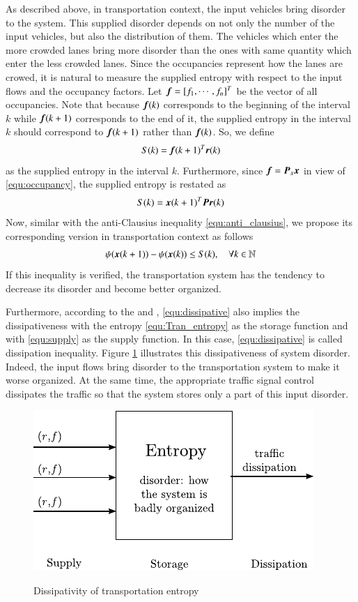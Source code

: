 \documentclass[preprint,authoryear,12pt]{elsarticle}
\renewcommand{\vec}[1]{\mbox{\boldmath$#1$}}
\newcommand{\mat}[1]{\mbox{\boldmath$#1$}}
\begin{document}
As described above, in transportation context, the input vehicles
bring disorder to the system. This supplied disorder depends on not
only the number of the input vehicles, but also the distribution of
them. The vehicles which enter the more crowded lanes bring more
disorder than the ones with same quantity which enter the less
crowded lanes. Since the occupancies represent how the lanes are
crowed, it is natural to measure the supplied entropy with respect to
the input flows and the occupancy factors. Let
$\vec{f}=[f_1,\cdots,f_n]^T$ be the vector of all occupancies. Note
that because $\vec{f}(k)$ corresponds to the beginning of the
interval $k$ while $\vec{f}(k+1)$ corresponds to the end of it, the
supplied entropy in the interval $k$ should correspond to
$\vec{f}(k+1)$ rather than $\vec{f}(k)$. So, we define
$$S(k)=\vec{f}(k+1)^T\vec{r}(k)$$
as the supplied entropy in the interval $k$. Furthermore, since
$\vec{f}=\mat{P}_x\vec{x}$ in view of \eqref{equ:occupancy}, the
supplied entropy is restated as
\begin{equation}\label{equ:supply}
    S(k)=\vec{x}(k+1)^T \mat{P} \vec{r}(k)
\end{equation}
Now, similar with the anti-Clausius inequality
\eqref{equ:anti_clausius}, we propose its corresponding version in
transportation context as follows
\begin{equation}\label{equ:dissipative}
\psi(\vec{x}(k+1))-\psi(\vec{x}(k)) \leq S(k),\quad \forall
k\in\mathbb{N}
\end{equation}
If this inequality is verified, the transportation system has the
tendency to decrease its disorder and become better organized.

Furthermore, according to the \citet{willems_dissipative_1972} and
\citet{hill_dissipative_1980}, \eqref{equ:dissipative} also implies
the dissipativeness with the entropy \eqref{equ:Tran_entropy} as the
storage function and with \eqref{equ:supply} as the supply function.
In this case, \eqref{equ:dissipative} is called dissipation
inequality. Figure \ref{fig:trans_dis} illustrates this
dissipativeness of system disorder. Indeed, the input flows bring
disorder to the transportation system to make it worse organized. At
the same time, the appropriate traffic signal control dissipates the
traffic so that the system stores only a part of this input disorder.
\begin{figure}[ht]
  \centering
  \includegraphics{pics/trans_dis}\\
  \caption{Dissipativity of transportation entropy}
  \label{fig:trans_dis}
\end{figure}
\end{document}
